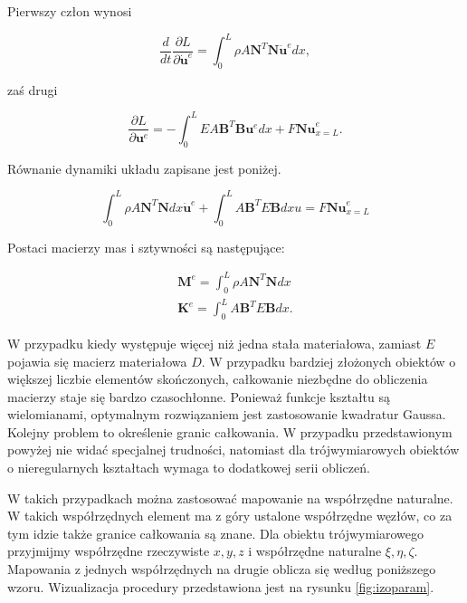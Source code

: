 Pierwszy człon wynosi

\begin{equation}
\frac{d}{dt} \frac{\partial L}{\partial \dot{\textbf{u}}^e} = \int_0^L \rho A {\textbf{N}}^T \textbf{N} {\ddot{\textbf{u}}}^e dx,
\end{equation}

zaś drugi

\begin{equation}
 \frac{\partial L}{\partial \textbf{u}^e} = -\int_0^L EA {\textbf{B}}^T \textbf{B} {\textbf{u}}^e dx + F \textbf{Nu}^e_{x=L}.
\end{equation}

Równanie dynamiki układu zapisane jest poniżej.

\begin{equation}
\int_0^L \rho A {\textbf{N}}^T \textbf{N} dx {\ddot{\textbf{u}}}^e + \int_0^L A {\textbf{B}}^T E \textbf{B} dx u = F \textbf{Nu}^e_{x=L}
\end{equation}

Postaci macierzy mas i sztywności są następujące:

\begin{gather}
\textbf{M}^e = \int_0^L \rho A {\textbf{N}}^T \textbf{N} dx \\
\textbf{K}^e = \int_0^L A {\textbf{B}}^T E \textbf{B} dx.
\end{gather}

W przypadku kiedy występuje więcej niż jedna stała materiałowa, zamiast \( E \) pojawia się macierz materiałowa \( D \). W przypadku bardziej złożonych obiektów o większej liczbie elementów skończonych, całkowanie niezbędne do obliczenia macierzy staje się bardzo czasochłonne. Ponieważ funkcje kształtu są wielomianami, optymalnym rozwiązaniem jest zastosowanie kwadratur Gaussa. Kolejny problem to określenie granic całkowania. W przypadku przedstawionym powyżej nie widać specjalnej trudności, natomiast dla trójwymiarowych obiektów o nieregularnych kształtach wymaga to dodatkowej serii obliczeń.

W takich przypadkach można zastosować mapowanie na współrzędne naturalne. W takich współrzędnych element ma z góry ustalone współrzędne węzłów, co za tym idzie także granice całkowania są znane. Dla obiektu trójwymiarowego przyjmijmy współrzędne rzeczywiste \( x, y, z \) i współrzędne naturalne \( \xi, \eta, \zeta \). Mapowania z jednych współrzędnych na drugie oblicza się według poniższego wzoru. Wizualizacja procedury przedstawiona jest na rysunku \ref{fig:izoparam}.


